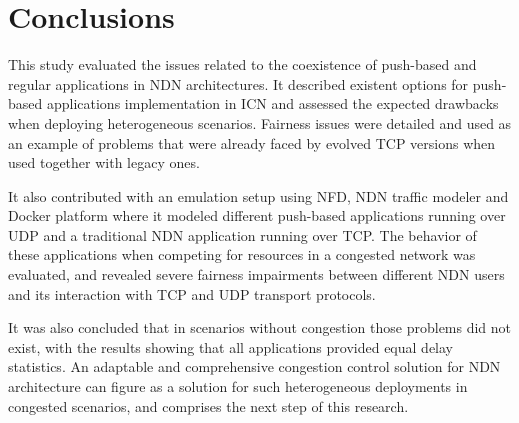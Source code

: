 \documentclass[11pt,conference]{./IEEEtran}
\begin{document}
	\section{Conclusions}  \label{sec:conclusions}

	This study evaluated the issues related to the coexistence of push-based and regular applications in NDN architectures. It described existent options for push-based applications implementation in ICN and assessed the expected drawbacks when deploying heterogeneous scenarios. Fairness issues were detailed and used as an example of problems that were already faced by evolved TCP versions when used together with legacy ones. 

	It also contributed with an emulation setup using NFD, NDN traffic modeler and Docker platform where it modeled different push-based applications running over UDP and a traditional NDN application running over TCP. The behavior of these applications when competing for resources in a congested network was evaluated, and revealed severe fairness impairments between different NDN users and its interaction with TCP and UDP transport protocols. 

	It was also concluded that in scenarios without congestion those problems did not exist, with the results showing that all applications provided equal delay statistics. An adaptable and comprehensive congestion control solution for NDN architecture can figure as a solution for such heterogeneous deployments in congested scenarios, and comprises the next step of this research. 
\end{document}
